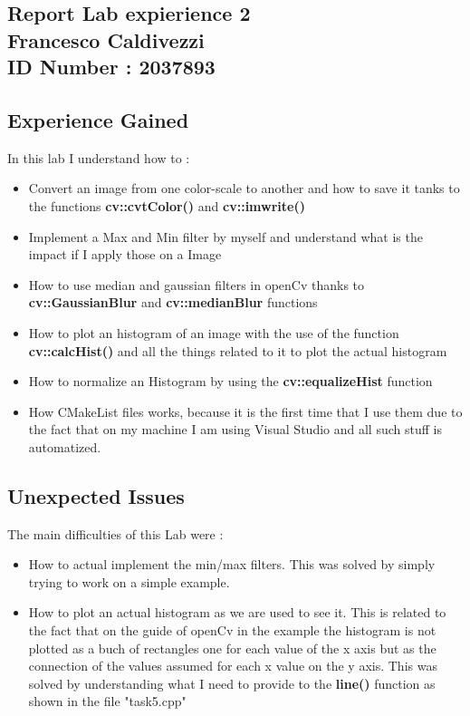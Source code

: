 \documentclass{article}
\begin{document}
\begin{flushleft}
\section*{Report Lab expierience 2\\ Francesco Caldivezzi \\ ID Number : 2037893}

\subsection*{Experience Gained}
In this lab I understand how to :
\begin{itemize}
  \item Convert an image from one color-scale to another and how to save it tanks to the functions \textbf{cv::cvtColor()} and \textbf{cv::imwrite()}
  \item Implement a Max and Min filter by myself and understand what is the impact if I apply those on a Image
  \item How to use median and gaussian filters in openCv thanks to \textbf{cv::GaussianBlur} and \textbf{cv::medianBlur} functions
  \item How to plot an histogram of an image with the use of the function \textbf{cv::calcHist()} and all the things related to it to plot the actual histogram
  \item How to normalize an Histogram by using the \textbf{cv::equalizeHist} function
  \item How CMakeList files works, because it is the first time that I use them due to the fact that on my machine I am using Visual Studio and all such stuff is automatized.
\end{itemize}

\newpage
\subsection*{Unexpected Issues}
The main difficulties of this Lab were :
\begin{itemize}
  \item How to actual implement the min/max filters. This was solved by simply trying to work on a simple example.
  \item How to plot an actual histogram as we are used to see it. This is related to the fact that on the guide of openCv in the example the histogram is not plotted as a buch of rectangles one for each value of the x axis but as the connection of the values assumed for each x value on the y axis. This was solved by understanding what I need to provide to the \textbf{line()} function as shown in the file "task5.cpp"
\end{itemize}


\end{flushleft}
\end{document}
